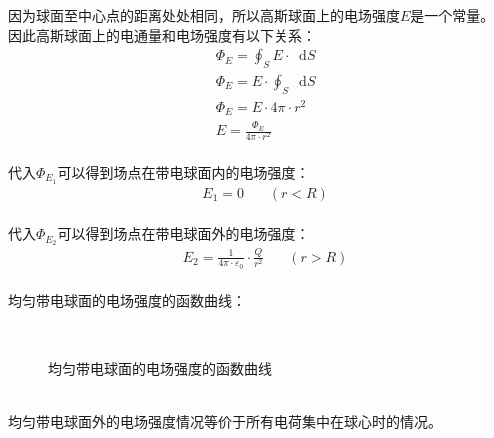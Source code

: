 \documentclass[UTF8]{ctexart}
\newcommand*{\dif}{\mathop{}\!\mathrm{d}}
\begin{document}
    因为球面至中心点的距离处处相同，所以高斯球面上的电场强度$E$是一个常量。\\[3mm]
    因此高斯球面上的电通量和电场强度有以下关系：\vspace{3pt}
    \begin{align}
        &\Phi_E=\oint_S E\cdot\dif S\\[3mm]
        &\Phi_E=E\cdot\oint_S\dif S\\[3mm]
        &\Phi_E=E\cdot 4\pi\cdot r^2\\[3mm]
        &E=\frac{\Phi_E}{4\pi\cdot r^2}
    \end{align}\\
    代入$\Phi_{E_1}$可以得到场点在带电球面内的电场强度：
    \begin{align}
        &E_1=0~~~~~~~~(r<R)
    \end{align}\\
    代入$\Phi_{E_2}$可以得到场点在带电球面外的电场强度：\vspace{3pt}
    \begin{align}
        &E_2=\frac{1}{4\pi\cdot\varepsilon_0}\cdot\frac{Q}{r^2}~~~~~~~~(r>R)
    \end{align}\\
    均匀带电球面的电场强度的函数曲线：\vspace{3pt}
    \begin{figure}[h]
        \begin{center}
            ~~~~
            \caption{均匀带电球面的电场强度的函数曲线}
        \end{center}
    \end{figure}\\
    均匀带电球面外的电场强度情况等价于所有电荷集中在球心时的情况。
\end{document}
